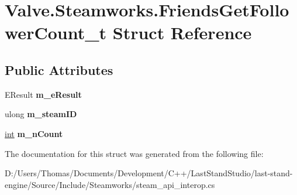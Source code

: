 \hypertarget{structValve_1_1Steamworks_1_1FriendsGetFollowerCount__t}{}\section{Valve.\+Steamworks.\+Friends\+Get\+Follower\+Count\+\_\+t Struct Reference}
\label{structValve_1_1Steamworks_1_1FriendsGetFollowerCount__t}
\subsection*{Public Attributes}
\begin{DoxyCompactItemize}
\item 
\hypertarget{structValve_1_1Steamworks_1_1FriendsGetFollowerCount__t_a163e4d54d50d507152ad275f4f055cb9}{}E\+Result {\bfseries m\+\_\+e\+Result}\label{structValve_1_1Steamworks_1_1FriendsGetFollowerCount__t_a163e4d54d50d507152ad275f4f055cb9}

\item 
\hypertarget{structValve_1_1Steamworks_1_1FriendsGetFollowerCount__t_a02cc7aa25e5eddbd5ef1b7b0593dd6b0}{}ulong {\bfseries m\+\_\+steam\+I\+D}\label{structValve_1_1Steamworks_1_1FriendsGetFollowerCount__t_a02cc7aa25e5eddbd5ef1b7b0593dd6b0}

\item 
\hypertarget{structValve_1_1Steamworks_1_1FriendsGetFollowerCount__t_ae6aab51df4190d81638862d03ad35e62}{}\hyperlink{SDL__thread_8h_a6a64f9be4433e4de6e2f2f548cf3c08e}{int} {\bfseries m\+\_\+n\+Count}\label{structValve_1_1Steamworks_1_1FriendsGetFollowerCount__t_ae6aab51df4190d81638862d03ad35e62}

\end{DoxyCompactItemize}


The documentation for this struct was generated from the following file\+:\begin{DoxyCompactItemize}
\item 
D\+:/\+Users/\+Thomas/\+Documents/\+Development/\+C++/\+Last\+Stand\+Studio/last-\/stand-\/engine/\+Source/\+Include/\+Steamworks/steam\+\_\+api\+\_\+interop.\+cs\end{DoxyCompactItemize}
